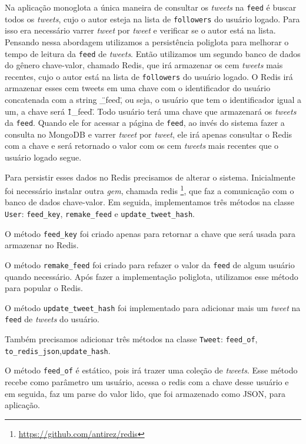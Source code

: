 Na aplicação monoglota a única maneira de consultar os \textit{tweets} na \verb|feed| é buscar todos os \textit{tweets}, cujo o autor esteja na lista de \verb|followers| do usuário logado. Para isso era necessário varrer \textit{tweet} por \textit{tweet} e verificar se o autor está na lista. Pensando nessa abordagem utilizamos a persistência poliglota para melhorar o tempo de leitura da \verb|feed| de \textit{tweets}.
Então utilizamos um segundo banco de dados do gênero chave-valor, chamado \ac{Redis}, que irá armazenar os cem \textit{tweets} mais recentes, cujo o autor está na lista de \verb|followers| do usuário logado.
O \ac{Redis} irá armazenar esses cem tweets em uma chave com o identificador do usuário concatenada com a string \"\_feed\", ou seja, o usuário que tem o identificador igual a um, a chave será \"1\_feed\". Todo usuário terá uma chave que armazenará os \textit{tweets} da \verb|feed|. Quando ele for acessar a página de \verb|feed|, ao invés do sistema fazer a consulta no MongoDB e varrer \textit{tweet} por \textit{tweet}, ele irá apenas consultar o \ac{Redis} com a chave e será retornado o valor com os cem \textit{tweets} mais recentes que o usuário logado segue.


Para persistir esses dados no \ac{Redis} precisamos de alterar o sistema. Inicialmente foi necessário instalar outra \textit{gem}, chamada redis \footnote{\url{https://github.com/antirez/redis}}, que faz a comunicação com o banco de dados chave-valor. Em seguida, implementamos três métodos na classe \verb|User|: \verb|feed_key|, \verb|remake_feed| e \verb|update_tweet_hash|.

O método \verb|feed_key| foi criado apenas para retornar a chave que será usada para armazenar no \ac{Redis}.

O método \verb|remake_feed| foi criado para refazer o valor da \verb|feed| de algum usuário quando necessário. Após fazer a implementação poliglota, utilizamos esse método para popular o \ac{Redis}.

O método \verb|update_tweet_hash| foi implementado para adicionar mais um \textit{tweet} na \verb|feed| de \textit{tweets} do usuário.

Também precisamos adicionar três métodos na classe \verb|Tweet|: \verb|feed_of|, \verb|to_redis_json|,\verb|update_hash|.

O método \verb|feed_of| é estático, pois irá trazer uma coleção de \textit{tweets}. Esse método recebe como parâmetro um usuário, acessa o redis com a chave desse usuário e em seguida, faz um parse do valor lido, que foi armazenado como JSON, para aplicação.


